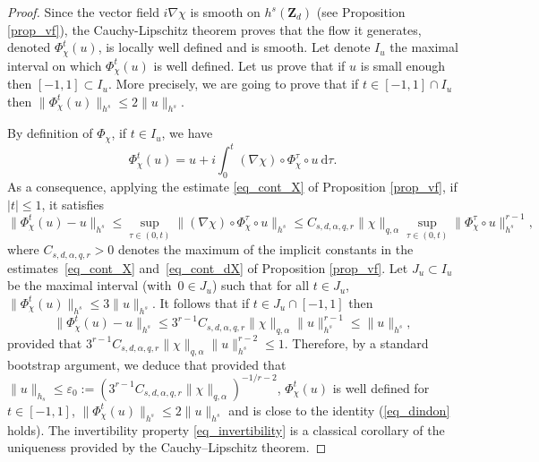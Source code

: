 \begin{proof} Since the vector field $i \nabla \chi$ is smooth on $h^s(\mathbf{Z}_d)$ (see Proposition \ref{prop_vf}), the Cauchy-Lipschitz theorem proves that the flow it generates, denoted $\Phi_\chi^{t} (u)$, is locally well defined and is smooth. Let denote $I_u$ the maximal interval on which $\Phi_\chi^{t} (u)$ is well defined. Let us prove that if $u$ is small enough then $[-1,1] \subset I_u$. More precisely, we are going to prove that if $t\in [-1,1]\cap I_u$ then $\| \Phi_\chi^{t} (u) \|_{h^s}\leq 2 \| u \|_{h^s}$.

By definition of $\Phi_\chi$, if $t\in I_u$, we have
\[
\Phi_\chi^{t} (u) = u + i \int_0^t (\nabla \chi)\circ \Phi_\chi^\tau \circ u \ \mathrm{d}\tau.
\]
As a consequence, applying the estimate \eqref{eq_cont_X} of Proposition \ref{prop_vf}, if $|t|\leq 1$, it satisfies
\[
\|\Phi_\chi^{t} (u) - u\|_{h^s} \leq \sup_{\tau \in (0,t)} \| (\nabla \chi)\circ \Phi_\chi^\tau \circ u \|_{h^s} \leq C_{s,d,\alpha,q,r} \|\chi \|_{q,\alpha} \sup_{\tau \in (0,t)} \| \Phi_\chi^\tau \circ u\|_{h^s}^{r-1},
\]
where $ C_{s,d,\alpha,q,r} >0$ denotes the maximum of the implicit constants in the estimates~\eqref{eq_cont_X} and~\eqref{eq_cont_dX} of Proposition \ref{prop_vf}. Let $J_u\subset I_u$ be the maximal interval (with~\hbox{$0\in J_u$}) such that for all $t\in J_u$, $\| \Phi_\chi^{t} (u) \|_{h^s}\leq 3 \| u \|_{h^s}$.
It follows that if $t\in J_u \cap [-1,1]$ then
\[
\|\Phi_\chi^{t} (u) - u\|_{h^s} \leq 3^{r-1} C_{s,d,\alpha,q,r} \|\chi \|_{q,\alpha} \| u \|_{h^s}^{r-1} \leq \| u \|_{h^s},
\]
provided that $3^{r-1} C_{s,d,\alpha,q,r} \|\chi \|_{q,\alpha} \| u \|_{h^s}^{r-2}\leq 1$. Therefore, by a standard bootstrap argument, we deduce that provided that $\| u \|_{h_s}\leq \varepsilon_0:= (3^{r-1} C_{s,d,\alpha,q,r} \|\chi \|_{q,\alpha})^{-1/r-2} $, $\Phi_\chi^t(u)$ is well defined for $t\in [-1,1]$, $\| \Phi_\chi^{t} (u) \|_{h^s}\leq 2 \| u \|_{h^s}$ and is close to the identity (\ie \eqref{eq_dindon} holds).
The invertibility property \eqref{eq_invertibility} is a classical corollary of the uniqueness provided by the Cauchy--Lipschitz theorem.


\end{proof}

